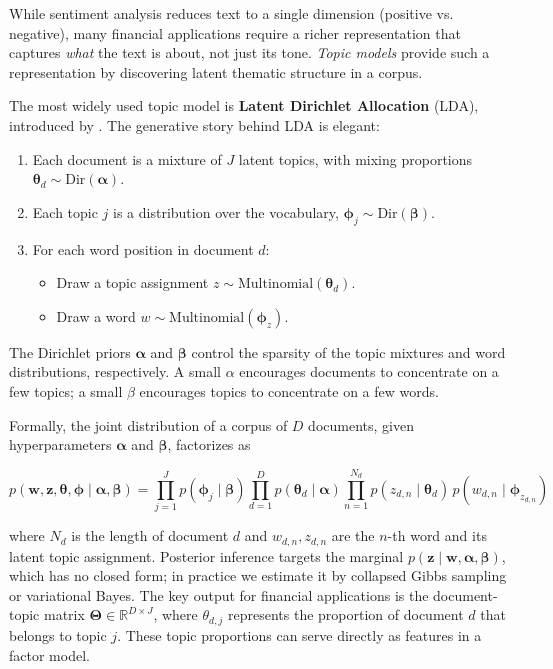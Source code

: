 While sentiment analysis reduces text to a single dimension (positive vs. negative), many financial applications require a richer representation that captures \textit{what} the text is about, not just its tone. \textit{Topic models} provide such a representation by discovering latent thematic structure in a corpus.

The most widely used topic model is \textbf{Latent Dirichlet Allocation} (LDA), introduced by \cite{blei2003latent}. The generative story behind LDA is elegant:

\begin{enumerate}
\item Each document is a mixture of $J$ latent topics, with mixing proportions $\boldsymbol{\theta}_d \sim \text{Dir}(\boldsymbol{\alpha})$.
\item Each topic $j$ is a distribution over the vocabulary, $\boldsymbol{\phi}_j \sim \text{Dir}(\boldsymbol{\beta})$.
\item For each word position in document $d$:

\begin{itemize}
\item Draw a topic assignment $z \sim \text{Multinomial}(\boldsymbol{\theta}_d)$.
\item Draw a word $w \sim \text{Multinomial}(\boldsymbol{\phi}_z)$.
\end{itemize}
\end{enumerate}

The Dirichlet priors $\boldsymbol{\alpha}$ and $\boldsymbol{\beta}$ control the sparsity of the topic mixtures and word distributions, respectively. A small $\alpha$ encourages documents to concentrate on a few topics; a small $\beta$ encourages topics to concentrate on a few words.

Formally, the joint distribution of a corpus of $D$ documents, given hyperparameters $\boldsymbol{\alpha}$ and $\boldsymbol{\beta}$, factorizes as

\begin{equation}
p(\mathbf{w}, \mathbf{z}, \boldsymbol{\theta}, \boldsymbol{\phi} \mid \boldsymbol{\alpha}, \boldsymbol{\beta}) = \prod_{j=1}^{J} p(\boldsymbol{\phi}_j \mid \boldsymbol{\beta}) \prod_{d=1}^{D} p(\boldsymbol{\theta}_d \mid \boldsymbol{\alpha}) \prod_{n=1}^{N_d} p(z_{d,n} \mid \boldsymbol{\theta}_d)\, p(w_{d,n} \mid \boldsymbol{\phi}_{z_{d,n}})
\tag{20.7}
\end{equation}

where $N_d$ is the length of document $d$ and $w_{d,n}, z_{d,n}$ are the $n$-th word and its latent topic assignment. Posterior inference targets the marginal $p(\mathbf{z} \mid \mathbf{w}, \boldsymbol{\alpha}, \boldsymbol{\beta})$, which has no closed form; in practice we estimate it by collapsed Gibbs sampling or variational Bayes. The key output for financial applications is the document-topic matrix $\boldsymbol{\Theta} \in \mathbb{R}^{D \times J}$, where $\theta_{d,j}$ represents the proportion of document $d$ that belongs to topic $j$. These topic proportions can serve directly as features in a factor model.

